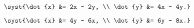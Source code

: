 \begin{multicols}{4}
\begin{enumtasks}
			\item \( \syst{\dot{x} &= 2x - 2y, \\ \dot{y} &= 4x - 4y.} \) %
			\item \( \syst{\dot{x} &= 4y - 6x, \\ \dot{y} &= 6y - 8x.} \) %
			

\end{enumtasks}
\end{multicols}

